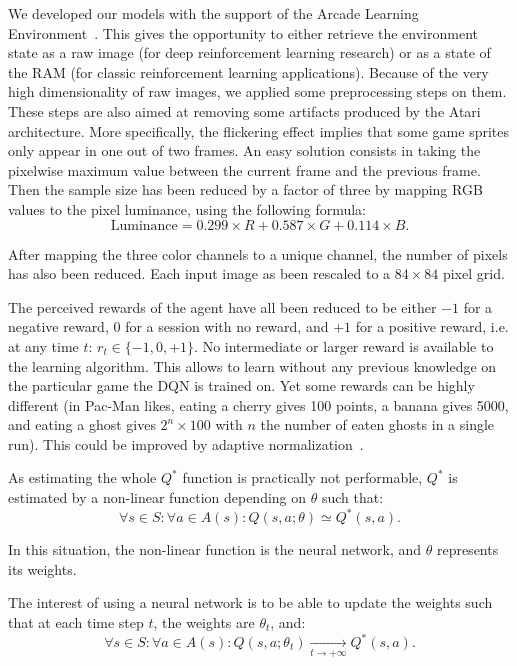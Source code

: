 \documentclass[letterpaper]{article}
\begin{document}
We developed our models with the support of the Arcade Learning Environment~\citep{bellemare13arcade}. This gives the opportunity to either
retrieve the environment state as a raw image (for deep reinforcement learning research) or as a state of the RAM (for classic reinforcement learning
applications). Because of the very high dimensionality of raw images, we applied some preprocessing steps on them. These steps are also aimed at
removing some artifacts produced by the Atari architecture. More specifically, the flickering effect implies that some game sprites only appear
in one out of two frames. An easy solution consists in taking the pixelwise maximum value between the current frame and the previous frame.
Then the sample size has been reduced by a factor of three by mapping RGB values to the pixel luminance, using the following formula:
\begin{equation}
    \text{Luminance} = 0.299 \times R + 0.587 \times G + 0.114 \times B.
\end{equation}

After mapping the three color channels to a unique channel, the number of pixels has also been reduced. Each input image as been rescaled to a
$84 \times 84$ pixel grid.

The perceived rewards of the agent have all been reduced to be either $-1$ for a negative reward, $0$ for a session with no reward, and $+1$
for a positive reward, i.e. at any time $t$: $r_t \in \{-1, 0, +1\}$. No intermediate or larger reward is available to the learning algorithm.
This allows to learn without any previous knowledge on the particular game the DQN is trained on. Yet some rewards can be highly different (in Pac-Man likes,
eating a cherry gives 100 points, a banana gives 5000, and eating a ghost gives $2^n \times 100$ with $n$ the number of eaten ghosts in a single run).
This could be improved by adaptive normalization~\citep{van2016learning}.

As estimating the whole $Q^*$ function is practically not performable, $Q^*$ is estimated by a non-linear function depending on $\theta$ such that:
\begin{equation}
	\forall s \in S : \forall a \in A(s) : Q(s, a; \theta) \simeq Q^*(s, a).
\end{equation}

In this situation, the non-linear function is the neural network, and $\theta$ represents its weights.

The interest of using a neural network is to be able to update the weights such that at each time step $t$, the weights are $\theta_t$, and:
\begin{equation}
	\forall s \in S : \forall a \in A(s) : Q(s, a; \theta_t) \xrightarrow[t \to +\infty]{} Q^*(s, a).
\end{equation}
\end{document}
